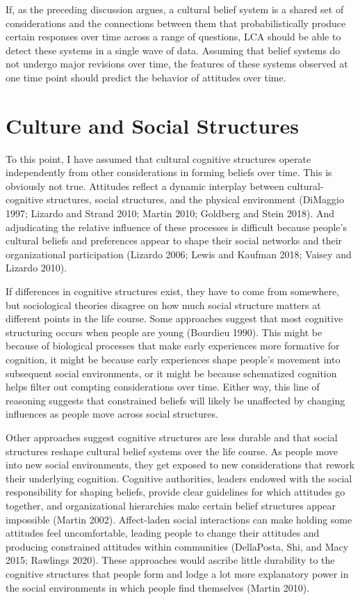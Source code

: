 \documentclass[12pt,]{article}
\begin{document}
If, as the preceding discussion argues, a cultural belief system is a shared set of considerations and the connections between them that probabilistically produce certain responses over time across a range of questions, LCA should be able to detect these systems in a single wave of data. Assuming that belief systems do not undergo major revisions over time, the features of these systems observed at one time point should predict the behavior of attitudes over time.

\hypertarget{culture-and-social-structures}{%
\section{Culture and Social Structures}\label{culture-and-social-structures}}

To this point, I have assumed that cultural cognitive structures operate independently from other considerations in forming beliefs over time. This is obviously not true. Attitudes reflect a dynamic interplay between cultural-cognitive structures, social structures, and the physical environment (DiMaggio 1997; Lizardo and Strand 2010; Martin 2010; Goldberg and Stein 2018). And adjudicating the relative influence of these processes is difficult because people's cultural beliefs and preferences appear to shape their social networks and their organizational participation (Lizardo 2006; Lewis and Kaufman 2018; Vaisey and Lizardo 2010).

If differences in cognitive structures exist, they have to come from somewhere, but sociological theories disagree on how much social structure matters at different points in the life course. Some approaches suggest that most cognitive structuring occurs when people are young (Bourdieu 1990). This might be because of biological processes that make early experiences more formative for cognition, it might be because early experiences shape people's movement into subsequent social environments, or it might be because schematized cognition helps filter out compting considerations over time. Either way, this line of reasoning suggests that constrained beliefs will likely be unaffected by changing influences as people move across social structures.

Other approaches suggest cognitive structures are less durable and that social structures reshape cultural belief systems over the life course. As people move into new social environments, they get exposed to new considerations that rework their underlying cognition. Cognitive authorities, leaders endowed with the social responsibility for shaping beliefs, provide clear guidelines for which attitudes go together, and organizational hierarchies make certain belief structures appear impossible (Martin 2002). Affect-laden social interactions can make holding some attitudes feel uncomfortable, leading people to change their attitudes and producing constrained attitudes within communities (DellaPosta, Shi, and Macy 2015; Rawlings 2020). These approaches would ascribe little durability to the cognitive structures that people form and lodge a lot more explanatory power in the social environments in which people find themselves (Martin 2010).
\end{document}
